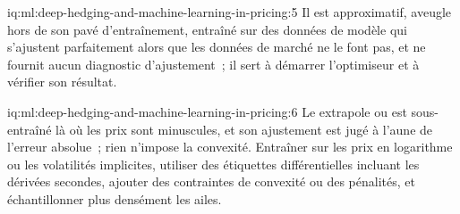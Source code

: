 \begin{solution}{iq:ml:deep-hedging-and-machine-learning-in-pricing:5}
Il est approximatif, aveugle hors de son pavé d'entraînement, entraîné sur des données de modèle qui s'ajustent parfaitement alors que les données de marché ne le font pas, et
ne fournit aucun diagnostic d'ajustement~; il sert à démarrer l'optimiseur et à vérifier son résultat.
\end{solution}

\begin{solution}{iq:ml:deep-hedging-and-machine-learning-in-pricing:6}
Le  extrapole ou est sous-entraîné là où les prix sont minuscules, et son ajustement est jugé à l'aune de l'erreur absolue~; rien n'impose
la convexité. Entraîner sur les prix en logarithme ou les volatilités implicites, utiliser des étiquettes différentielles incluant les dérivées secondes, ajouter des contraintes de
convexité ou des pénalités, et échantillonner plus densément les ailes.
\end{solution}
